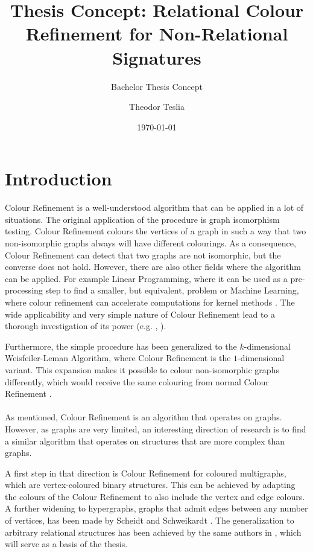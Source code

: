 \documentclass[a4paper,11pt,DIV=15]{scrartcl} %
\theoremstyle{plain}
\theoremstyle{definition}
\begin{document}
\subtitle{Bachelor Thesis Concept}
\date{\today}
\publishers{RWTH Aachen University}	%

\title{Thesis Concept: Relational Colour Refinement for Non-Relational Signatures}

\author{Theodor Teslia}

\maketitle

\section{Introduction}

Colour Refinement is a well-understood algorithm that can be applied in a lot of situations.
The original application of the procedure is graph isomorphism testing.
Colour Refinement colours the vertices of a graph in such a way that two non-isomorphic graphs always will have different colourings.
As a consequence, Colour Refinement can detect that two graphs are not isomorphic, but the converse does not hold.
However, there are also other fields where the algorithm can be applied.
For example Linear Programming, where it can be used as a pre-processing step to find a smaller, but equivalent, problem or Machine Learning, where colour refinement can accelerate computations for kernel methods \cite{grohe2021color}.
The wide applicability and very simple nature of Colour Refinement lead to a thorough investigation of its power (e.g. \cite{fluck2023going}, \cite{manvcinska2020quantum}).

Furthermore, the simple procedure has been generalized to the $k$-dimensional Weisfeiler-Leman Algorithm, where Colour Refinement is the $1$-dimensional variant.
This expansion makes it possible to colour non-isomorphic graphs differently, which would receive the same colouring from normal Colour Refinement \cite{kiefer2020power}.
\\ \\
As mentioned, Colour Refinement is an algorithm that operates on graphs.
However, as graphs are very limited, an interesting direction of research is to find a similar algorithm that operates on structures that are more complex than graphs.

A first step in that direction is Colour Refinement for coloured multigraphs, which are vertex-coloured binary structures. 
This can be achieved by adapting the colours of the Colour Refinement to also include the vertex and edge colours. \cite{scheidt2024color}
A further widening to hypergraphs, graphs that admit edges between any number of vertices, has been made by Scheidt and Schweikardt \cite{scheidt2023counting}.
The generalization to arbitrary relational structures has been achieved by the same authors in \cite{scheidt2024color}, which will serve as a basis of the thesis.
\end{document}
